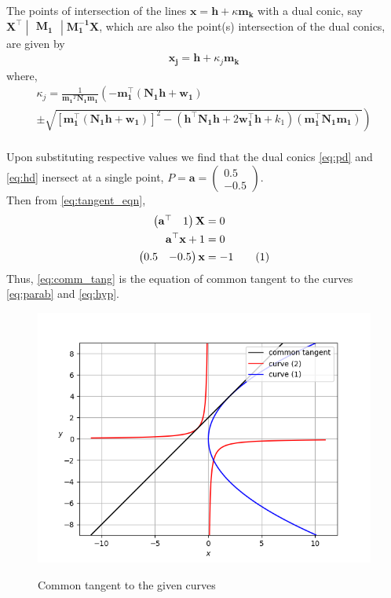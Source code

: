 \documentclass[journal,12pt,twocolumn]{IEEEtran}
\let\vec\mathbf
\newcommand{\myvec}[1]{\ensuremath{\begin{pmatrix}#1\end{pmatrix}}}
\newcommand{\mydet}[1]{\ensuremath{\begin{vmatrix}#1\end{vmatrix}}}
\providecommand{\brak}[1]{\ensuremath{\left(#1\right)}}
\newcommand\numberthis{\addtocounter{equation}{1}\tag{\theequation}}
\providecommand{\lbrak}[1]{\ensuremath{\left(#1\right.}}
\providecommand{\rbrak}[1]{\ensuremath{\left.#1\right)}}
\providecommand{\sbrak}[1]{\ensuremath{{}\left[#1\right]}}
\begin{document}
The points of intersection of the lines $\vec{x} = \vec{h} + \kappa\vec{m_k}$ with a dual conic, say $\vec{X^{\top}}\mydet{\vec{M_1}}\vec{M_1^{-1}}\vec{X}$, which are also the point(s) intersection of the dual conics, are given by
\begin{align}
		\vec{x_j} = \vec{h} + \kappa_j\vec{m_k}
\end{align}
where,
{\small
\begin{multline*}
\kappa_j = \frac{1}
{
\vec{m_1}^T\vec{N_1}\vec{m_1}
}
\lbrak{-\vec{m_1^{\top}}\brak{\vec{N_1}\vec{h}+\vec{w_1}}}
\\[0.5ex]
\pm
\rbrak{\sqrt{
\sbrak{
\vec{m_1^{\top}}\brak{\vec{N_1}\vec{h}+\vec{w_1}}
}^2
-
\brak
{
\vec{h^{\top}}\vec{N_1}\vec{h} + 2\vec{w_1^{\top}}\vec{h} +k_1
}
\brak{\vec{m_1^{\top}}\vec{N_1}\vec{m_1}}
}
}
\end{multline*}
}
\\
Upon substituting respective values we find that the dual conics \eqref{eq:pd} and \eqref{eq:hd} inersect at a single point, $P=\vec{a}=\myvec{0.5\\-0.5}$. 
\\[0.7ex]
Then from \eqref{eq:tangent_eqn}, 
\begin{align*}
		\myvec{\vec{a^{\top}}&1}\vec{X} &= 0 \\
		\vec{a^{\top}}\vec{x} + 1 &= 0 \\
		\myvec{0.5&-0.5}\vec{x} &= -1 \label{eq:comm_tang} \numberthis
\end{align*}
Thus, \eqref{eq:comm_tang} is the equation of common tangent to the curves \eqref{eq:parab} and \eqref{eq:hyp}.
\newpage
\begin{figure}[h!]
\centering
%
\includegraphics[width=\columnwidth]{figs/comm_tan.png}
\label{fig:comm_tan}
\caption{Common tangent to the given curves}
\end{figure}
\end{document}
